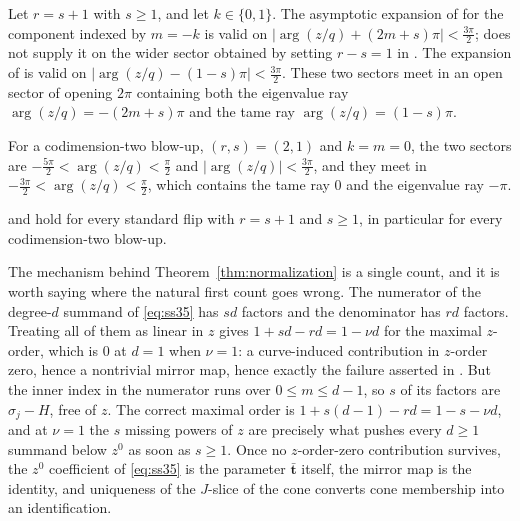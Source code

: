 \begin{theorem}
  \label{thm:aperture}
  Let \(r=s+1\) with \(s\ge1\), and let \(k\in\{0,1\}\).  The asymptotic
  expansion of \cite[Proposition~7.5]{SS} for the component indexed by
  \(m=-k\) is valid on
  \(\bigl|\arg(z/q)+(2m+s)\pi\bigr|<\tfrac{3\pi}{2}\); \cite[Theorem~A.1]{SS}
  does not supply it on the wider sector obtained by setting \(r-s=1\)
  in \cite[(64)]{SS}.  The expansion of
  \cite[Proposition~8.2]{SS} is valid on
  \(\bigl|\arg(z/q)-(1-s)\pi\bigr|<\tfrac{3\pi}{2}\).  These two sectors meet
  in an open sector of opening \(2\pi\) containing both the eigenvalue ray
  \(\arg(z/q)=-(2m+s)\pi\) and the tame ray \(\arg(z/q)=(1-s)\pi\).
\end{theorem}

For a codimension-two blow-up, \((r,s)=(2,1)\) and \(k=m=0\), the two
sectors are \(-\tfrac{5\pi}{2}<\arg(z/q)<\tfrac{\pi}{2}\) and
\(|\arg(z/q)|<\tfrac{3\pi}{2}\), and they meet in
\(-\tfrac{3\pi}{2}<\arg(z/q)<\tfrac{\pi}{2}\), which contains the tame ray
\(0\) and the eigenvalue ray \(-\pi\).

\begin{corollary}
  \label{cor:repaired}
  \cite[Theorems~1.2, 1.4, 9.9 and~9.14]{SS} and \cite[Corollary~1.5]{SS}
  hold for every standard flip with \(r=s+1\) and \(s\ge1\), in particular
  for every codimension-two blow-up.
\end{corollary}

The mechanism behind Theorem~\ref{thm:normalization} is a single count, and
it is worth saying where the natural first count goes wrong.  The numerator
of the degree-\(d\) summand of \eqref{eq:ss35} has \(sd\) factors and the
denominator has \(rd\) factors.  Treating all of them as linear in \(z\)
gives \(1+sd-rd=1-\nu d\) for the maximal \(z\)-order, which is \(0\) at
\(d=1\) when \(\nu=1\): a curve-induced contribution in \(z\)-order zero,
hence a nontrivial mirror map, hence exactly the failure asserted in
\cite[Remark~4.5(3)]{SS}.  But the inner index in the numerator runs over
\(0\le m\le d-1\), so \(s\) of its factors are \(\sigma_{j}-H\), free of
\(z\).  The correct maximal order is \(1+s(d-1)-rd=1-s-\nu d\), and at
\(\nu=1\) the \(s\) missing powers of \(z\) are precisely what pushes every
\(d\ge1\) summand below \(z^{0}\) as soon as \(s\ge1\).  Once no
\(z\)-order-zero contribution survives, the \(z^{0}\) coefficient of
\eqref{eq:ss35} is the parameter \(\bar{\mathbf t}\) itself, the mirror map
is the identity, and uniqueness of the \(J\)-slice of the cone converts cone
membership into an identification.

